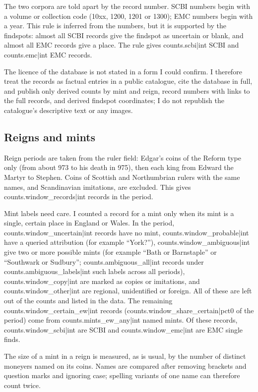 \documentclass[11pt,a4paper]{article}
\begin{document}
The two corpora are told apart by the record number. SCBI numbers begin with a volume or collection code (10xx, 1200, 1201 or 1300); EMC numbers begin with a year. This rule is inferred from the numbers, but it is supported by the findspots: almost all SCBI records give the findspot as uncertain or blank, and almost all EMC records give a place. The rule gives {{counts.scbi|int}} SCBI and {{counts.emc|int}} EMC records.

The licence of the database is not stated in a form I could confirm. I therefore treat the records as factual entries in a public catalogue, cite the database in full, and publish only derived counts by mint and reign, record numbers with links to the full records, and derived findspot coordinates; I do not republish the catalogue's descriptive text or any images.

\subsection{Reigns and mints}

Reign periods are taken from the ruler field: Edgar's coins of the Reform type only (from about 973 to his death in 975), then each king from Edward the Martyr to Stephen. Coins of Scottish and Northumbrian rulers with the same names, and Scandinavian imitations, are excluded. This gives {{counts.window_records|int}} records in the period.

Mint labels need care. I counted a record for a mint only when its mint is a single, certain place in England or Wales. In the period, {{counts.window_uncertain|int}} records have no mint, {{counts.window_probable|int}} have a queried attribution (for example ``York?''), {{counts.window_ambiguous|int}} give two or more possible mints (for example ``Bath or Barnstaple'' or ``Southwark or Sudbury''; {{counts.ambiguous_all|int}} records under {{counts.ambiguous_labels|int}} such labels across all periods), {{counts.window_copy|int}} are marked as copies or imitations, and {{counts.window_other|int}} are regional, unidentified or foreign. All of these are left out of the counts and listed in the data. The remaining {{counts.window_certain_ew|int}} records ({{counts.window_share_certain|pct0}} of the period) come from {{counts.mints_ew_any|int}} named mints. Of these records, {{counts.window_scbi|int}} are SCBI and {{counts.window_emc|int}} are EMC single finds.

The size of a mint in a reign is measured, as is usual, by the number of distinct moneyers named on its coins. Names are compared after removing brackets and question marks and ignoring case; spelling variants of one name can therefore count twice.
\end{document}
